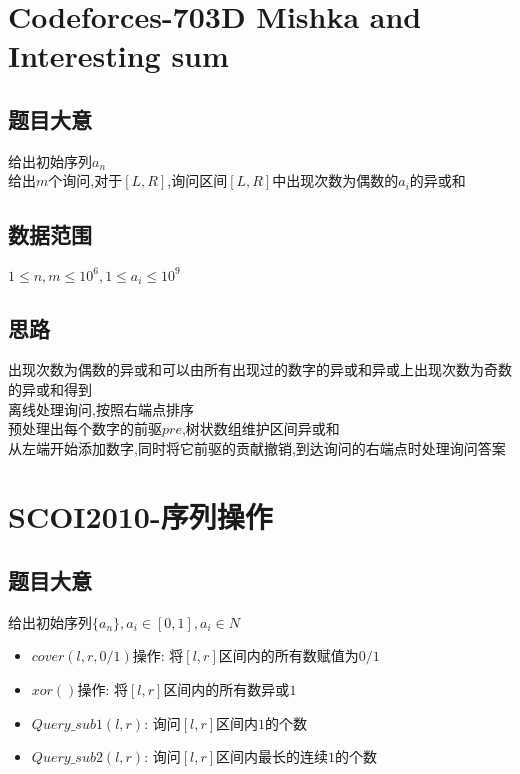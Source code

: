 \documentclass{ctexart}
\numberwithin{equation}{section}
\begin{document}
\begin{flushleft}
  \section{Codeforces-703D Mishka and Interesting sum}
  \subsection{题目大意}
  给出初始序列${a_n}$ \\
  给出$m$个询问,对于$[L,R]$,询问区间$[L,R]$中出现次数为偶数的$a_i$的异或和 \\
  \subsection{数据范围}
  $1\le n,m\le 10^6,1\le a_i\le 10^9 $ \\
  \subsection{思路}
  出现次数为偶数的异或和可以由所有出现过的数字的异或和异或上出现次数为奇数的异或和得到 \\
  离线处理询问,按照右端点排序 \\
  预处理出每个数字的前驱$pre$,树状数组维护区间异或和 \\
  从左端开始添加数字,同时将它前驱的贡献撤销,到达询问的右端点时处理询问答案 \\
  \newpage

  \section{SCOI2010-序列操作}
  \subsection{题目大意}
  给出初始序列$\{a_n\},a_i\in [0,1],a_i\in N$\\
  \begin{itemize}
  \item $cover(l,r,0/1)$操作: 将$[l,r]$区间内的所有数赋值为$0/1$ \\
  \item $xor()$操作: 将$[l,r]$区间内的所有数异或$1$ \\
  \item $Query\_sub1(l,r)$: 询问$[l,r]$区间内$1$的个数 \\
  \item $Query\_sub2(l,r)$: 询问$[l,r]$区间内最长的连续$1$的个数 \\ 
  \end{itemize}

\end{flushleft}
\end{document}
